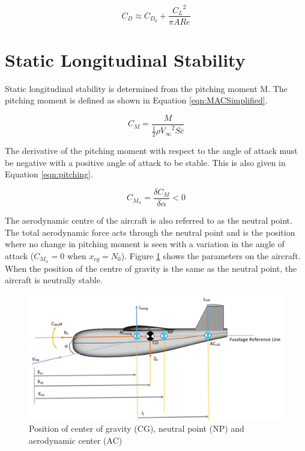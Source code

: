 \begin{equation}
    C_D \approx C_{D_0} + \frac{{C_L}^2}{\pi ARe}
    \label{eqn:Cd}
\end{equation}



\section{Static Longitudinal Stability}

Static longitudinal stability is determined from the pitching moment M. The pitching moment is defined as shown in Equation \ref{eqn:MACSimplified}.

\begin{equation}
    C_M = \frac{M}{\frac{1}{2}\rho {V_\infty}^2 S \overline{c}}
\end{equation}

The derivative of the pitching moment with respect to the angle of attack must be negative with a positive angle of attack to be stable. This is also given in Equation \ref{eqn:pitching}.

\begin{equation}
    C_{M_\alpha} = \frac{\delta C_M}{\delta \alpha} < 0 
    \label{eqn:pitching}
\end{equation}

The aerodynamic centre of the aircraft is also referred to as the neutral point. The total aerodynamic force acts through the neutral point and is the position where no change in pitching moment is seen with a variation in the angle of attack ($C_{M_\alpha} = 0$ when $x_{cg} = N_0$). Figure \ref{fig:AC} shows the parameters on the aircraft. When the position of the centre of gravity is the same as the neutral point, the aircraft is neutrally stable. 

\begin{figure}[H]
  \centering
   \includegraphics[width=1\linewidth]{03_LiteratureReview/Figs/CGNPAC.JPG}
  \caption{Position of center of gravity (CG), neutral point (NP) and aerodynamic center (AC)}
  \label{fig:AC}
\end{figure}

